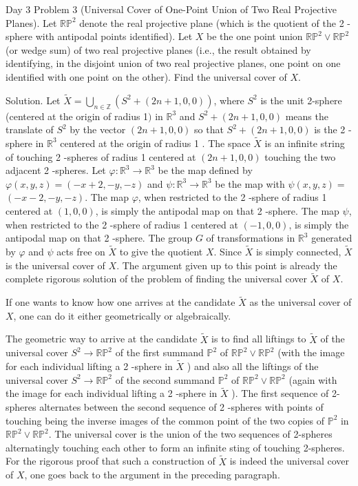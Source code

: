 \documentclass[10pt]{article}
\begin{document}
Day 3 Problem 3 (Universal Cover of One-Point Union of Two Real Projective Planes). Let $\mathbb{R P}^{2}$ denote the real projective plane (which is the quotient of the 2 -sphere with antipodal points identified). Let $X$ be the one point union $\mathbb{R} \mathbb{P}^{2} \vee \mathbb{R P}^{2}$ (or wedge sum) of two real projective planes (i.e., the result obtained by identifying, in the disjoint union of two real projective planes, one point on one identified with one point on the other). Find the universal cover of $X$.

Solution. Let $\tilde{X}=\bigcup_{n \in \mathbb{Z}}\left(S^{2}+(2 n+1,0,0)\right)$, where $S^{2}$ is the unit 2-sphere (centered at the origin of radius 1$)$ in $\mathbb{R}^{3}$ and $S^{2}+(2 n+1,0,0)$ means the translate of $S^{2}$ by the vector $(2 n+1,0,0)$ so that $S^{2}+(2 n+1,0,0)$ is the 2 -sphere in $\mathbb{R}^{3}$ centered at the origin of radius 1 . The space $\tilde{X}$ is an infinite string of touching 2 -spheres of radius 1 centered at $(2 n+1,0,0)$ touching the two adjacent 2 -spheres. Let $\varphi: \mathbb{R}^{3} \rightarrow \mathbb{R}^{3}$ be the map defined by $\varphi(x, y, z)=(-x+2,-y,-z)$ and $\psi: \mathbb{R}^{3} \rightarrow \mathbb{R}^{3}$ be the map with $\psi(x, y, z)=$ $(-x-2,-y,-z)$. The map $\varphi$, when restricted to the 2 -sphere of radius 1 centered at $(1,0,0)$, is simply the antipodal map on that 2 -sphere. The map $\psi$, when restricted to the 2 -sphere of radius 1 centered at $(-1,0,0)$, is simply the antipodal map on that 2 -sphere. The group $G$ of transformations in $\mathbb{R}^{3}$ generated by $\varphi$ and $\psi$ acts free on $\tilde{X}$ to give the quotient $X$. Since $\tilde{X}$ is simply connected, $\tilde{X}$ is the universal cover of $X$. The argument given up to this point is already the complete rigorous solution of the problem of finding the universal cover $\tilde{X}$ of $X$.

If one wants to know how one arrives at the candidate $\tilde{X}$ as the universal cover of $X$, one can do it either geometrically or algebraically.

The geometric way to arrive at the candidate $\tilde{X}$ is to find all liftings to $\tilde{X}$ of the universal cover $S^{2} \rightarrow \mathbb{R} \mathbb{P}^{2}$ of the first summand $\mathbb{P}^{2}$ of $\mathbb{R} \mathbb{P}^{2} \vee \mathbb{R} \mathbb{P}^{2}$ (with the image for each individual lifting a 2 -sphere in $\tilde{X}$ ) and also all the liftings of the universal cover $S^{2} \rightarrow \mathbb{R P}^{2}$ of the second summand $\mathbb{P}^{2}$ of $\mathbb{R P}^{2} \vee \mathbb{R P}^{2}$ (again with the image for each individual lifting a 2 -sphere in $\tilde{X}$ ). The first sequence of 2-spheres alternates between the second sequence of 2 -spheres with points of touching being the inverse images of the common point of the two copies of $\mathbb{P}^{2}$ in $\mathbb{R P}^{2} \vee \mathbb{R P}^{2}$. The universal cover is the union of the two sequences of 2-spheres alternatingly touching each other to form an infinite
sting of touching 2-spheres. For the rigorous proof that such a construction of $\tilde{X}$ is indeed the universal cover of $X$, one goes back to the argument in the preceding paragraph.
\end{document}
